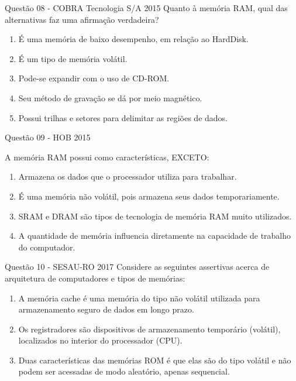 \documentclass[aspectratio=169,
				xcolor=table]{beamer}
\begin{document}
	\begin{frame}{Questão 08 - COBRA Tecnologia S/A 2015}
		Quanto à memória RAM, qual das alternativas faz uma afirmação verdadeira?
		\begin{enumerate}[a]
			\item É uma memória de baixo desempenho, em relação ao HardDisk.
			\item É um tipo de memória volátil.
			\item Pode-se expandir com o uso de CD-ROM.
			\item Seu método de gravação se dá por meio magnético.
			\item Possui trilhas e setores para delimitar as regiões de dados.
		\end{enumerate}
	\end{frame}	
	
	\begin{frame}{Questão 09 - HOB 2015}
	
		A memória RAM possui como características, EXCETO:
		
		\begin{enumerate}[a]
			\large
			\item Armazena os dados que o processador utiliza para trabalhar.
			\item É uma memória não volátil, pois armazena seus dados temporariamente.
			\item SRAM e DRAM são tipos de tecnologia de memória RAM muito utilizados.
			\item A quantidade de memória influencia diretamente na capacidade de trabalho do computador.
		\end{enumerate}

	\end{frame}	
	
	\begin{frame}{Questão 10 - SESAU-RO 2017} 
		Considere as seguintes assertivas acerca de arquitetura de computadores e tipos de memórias:
		\begin{enumerate}[I]
			\item A memória cache é uma memória do tipo não volátil utilizada para armazenamento seguro de dados em longo prazo.
			\item Os registradores são dispositivos de armazenamento temporário (volátil), localizados no interior do processador (CPU).
			\item Duas características das memórias ROM é que elas são do tipo volátil e não podem ser acessadas de modo aleatório, apenas sequencial.
		\end{enumerate}
	\end{frame}
\end{document}
